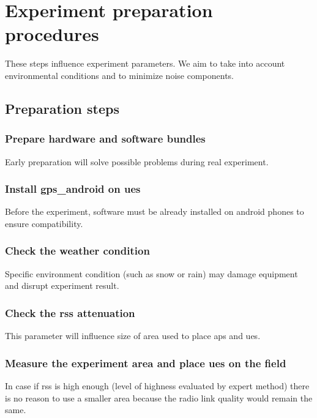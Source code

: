 \section{Experiment preparation procedures}\label{experiment-preparation-procedures}

These steps influence experiment parameters. We aim to take into account
environmental conditions and to minimize noise components.


\subsection{Preparation steps}\label{steps}

\subsubsection{Prepare hardware and software bundles}

Early preparation will solve possible problems during real experiment.

\subsubsection{Install \gls{gps_android} on \glspl{ue}}

Before the experiment, software must be already installed on \gls{android} phones to ensure compatibility.

\subsubsection{Check the weather condition}

Specific environment condition (such as snow or rain) may damage equipment
and disrupt experiment result.

\subsubsection{Check the \gls{rss} attenuation}

This parameter will influence size of area used to place \glspl{ap} and \glspl{ue}.


\subsubsection{Measure the experiment area and place \glspl{ue} on the field}

In case if \gls{rss} is high enough (level of highness evaluated by expert method) there is no reason to use a smaller area
because the radio link quality would remain the same.